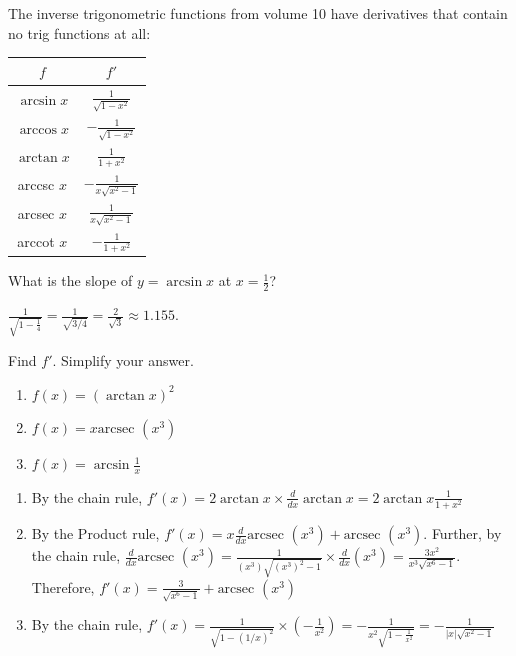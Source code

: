 The inverse trigonometric functions from volume 10 have derivatives that
contain no trig functions at all:


\begin{center}
\begin{tabular}{ |c|c| }
	\hline
	$f$ & $f'$\\
	\hline
	$\arcsin{x}$ & $\frac{1}{\sqrt{1 - x^2}}$\\
	\hline
	\index{arccosine}$\arccos{x}$ & $ - \frac{1}{\sqrt{1 - x^2}}$\\
	\hline
	\index{arctangent}$\arctan{x}$ & $\frac{1}{1 + x^2}$\\
	\hline
	arccsc $x$ & $ - \frac{1}{x\sqrt{x^2-1}}$\\
	\hline
	\index{arcsecant}arcsec $x$ & $\frac{1}{x\sqrt{x^2-1}}$\\
	\hline
	arccot $x$ & $ - \frac{1}{1+x^2}$\\
	\hline
\end{tabular}
\end{center}

\begin{Worked}
\begin{Problem}
What is the slope of $y = \arcsin x$ at
$x = \frac{1}{2}$?
\end{Problem}
\begin{Solution}
$\frac{1}{\sqrt{1 - \frac{1}{4}}} = \frac{1}{\sqrt{3/4}} = \frac{2}{\sqrt{3}} \approx 1.155$.
\end{Solution}
\end{Worked}


\begin{Exercise}[label=invtrig1]
Find $f'$. Simplify your answer. 
\begin{enumerate}
\item $f(x) = (\arctan{x})^2$
\item $f(x) = x\text{arcsec }(x^3)$
\item $f(x) = \arcsin{\frac{1}{x}}$
\end{enumerate}
\end{Exercise}

\begin{Answer}[ref=invtrig1]
\begin{enumerate}
\item By the chain rule, $f'(x) = 2\arctan{x} \times \frac{d}{dx}\arctan{x} = 2\arctan{x}\frac{1}{1 + x^2}$
\item By the Product rule, $f'(x) = x \frac{d}{dx}\text{arcsec }(x^3) + \text{arcsec }(x^3)$. Further, by the chain rule, $\frac{d}{dx}\text{arcsec }(x^3) = \frac{1}{(x^3)\sqrt{(x^3)^2-1}} \times \frac{d}{dx}(x^3) = \frac{3x^2}{x^3\sqrt{x^6-1}}$. Therefore, $f'(x) = \frac{3}{\sqrt{x^6-1}} + \text{arcsec }(x^3)$
\item By the chain rule, $f'(x) = \frac{1}{\sqrt{1-(1/x)^2}} \times \left(- \frac{1}{x^2}\right) = - \frac{1}{x^2\sqrt{1-\frac{1}{x^2}}} = -\frac{1}{|x|\sqrt{x^2 - 1}}$
\end{enumerate}
\end{Answer}

